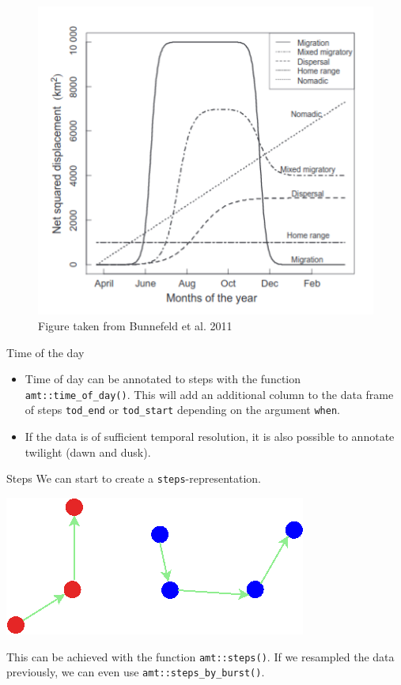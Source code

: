\documentclass[ignorenonframetext,,t]{beamer}
\providecommand{\tightlist}{%
\setlength{\itemsep}{0pt}\setlength{\parskip}{0pt}}
\providecommand{\tightlist}{%
\setlength{\itemsep}{0pt}\setlength{\parskip}{0pt}}
\renewcommand{\tightlist}{\setlength{\itemsep}{1.4ex}\setlength{\parskip}{0pt}}
\begin{document}
\begin{frame}
\begin{figure}

{\centering \includegraphics[width=0.6\linewidth]{img/nsd} 

}

\caption{Figure taken from Bunnefeld et al. 2011}\label{fig:unnamed-chunk-8}
\end{figure}
\end{frame}

\begin{frame}[fragile]{Time of the day}
\protect\hypertarget{time-of-the-day}{}
\begin{itemize}
\tightlist
\item
  Time of day can be annotated to steps with the function
  \texttt{amt::time\_of\_day()}. This will add an additional column to
  the data frame of steps \texttt{tod\_end} or \texttt{tod\_start}
  depending on the argument \texttt{when}.
\item
  If the data is of sufficient temporal resolution, it is also possible
  to annotate twilight (dawn and dusk).
\end{itemize}
\end{frame}

\begin{frame}[fragile]{Steps}
\protect\hypertarget{steps}{}
We can start to create a \texttt{steps}-representation.

\begin{center}\includegraphics[width=0.5\linewidth]{img/steps} \end{center}

This can be achieved with the function \texttt{amt::steps()}. If we
resampled the data previously, we can even use
\texttt{amt::steps\_by\_burst()}.
\end{frame}
\end{document}
